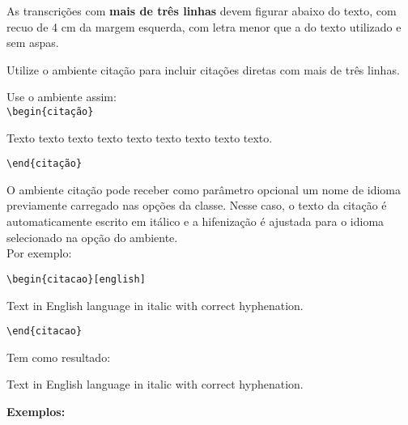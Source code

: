As transcrições com \textbf{mais de três linhas} devem figurar abaixo do texto, com recuo de 4 cm da margem esquerda, com letra menor que a do texto utilizado e sem aspas. 

Utilize o ambiente citação para incluir citações diretas com mais de três linhas.

Use o ambiente assim: \\

\verb+\begin{citação}+

Texto texto texto texto texto texto texto texto texto.

\verb+\end{citação}+

O ambiente citação pode receber como parâmetro opcional um nome de idioma previamente carregado nas opções da classe. Nesse caso, o texto da citação é automaticamente escrito em itálico e a hifenização é ajustada para o idioma selecionado na opção do ambiente.\\
  Por exemplo:
 
\verb+\begin{citacao}[english]+
 
 Text in English language in italic with correct hyphenation.
 
\verb+\end{citacao}+
 
Tem como resultado:
\begin{citacao}[english]
Text in English language in italic with correct hyphenation. \\
\end{citacao}

\textbf{Exemplos:} 

